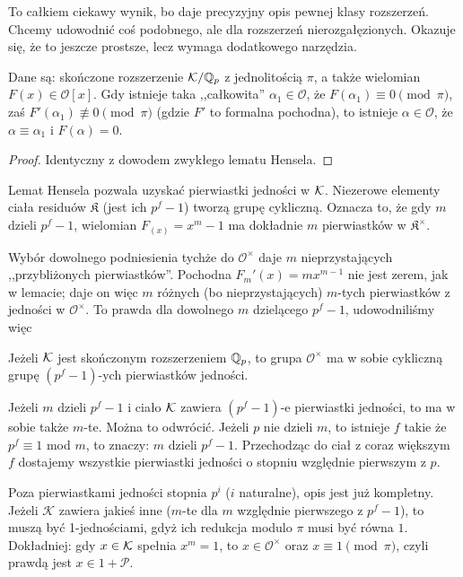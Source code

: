 To całkiem ciekawy wynik, bo daje precyzyjny opis pewnej klasy rozszerzeń.
Chcemy udowodnić coś podobnego, ale dla rozszerzeń nierozgałęzionych.
Okazuje się, że to jeszcze prostsze, lecz wymaga dodatkowego narzędzia.

\begin{twierdzenie}
	Dane są: skończone rozszerzenie $\mathcal K/\mathbb Q_p$ z jednolitością $\pi$, a także wielomian $F(x) \in \mathcal O[x]$.
	Gdy istnieje taka ,,całkowita'' $\alpha_1 \in \mathcal O$, że $F(\alpha_1) \equiv 0 \pmod \pi$, zaś $F'(\alpha_1) \not\equiv 0 \pmod \pi$ (gdzie $F'$ to formalna pochodna), to istnieje $\alpha \in \mathcal O$, że $\alpha \equiv \alpha_1$ i $F(\alpha) = 0$.
\end{twierdzenie}

\begin{proof}
	Identyczny z dowodem zwykłego lematu Hensela.
\end{proof}

Lemat Hensela pozwala uzyskać pierwiastki jedności w $\mathcal K$.
Niezerowe elementy ciała residuów $\mathfrak K$ (jest ich $p^f -1$) tworzą grupę cykliczną.
Oznacza to, że gdy $m$ dzieli $p^f-1$, wielomian $F_(x) = x^m-1$ ma dokładnie $m$ pierwiastków w $\mathfrak K^\times$.

Wybór dowolnego podniesienia tychże do $\mathcal O^\times$ daje $m$ nieprzystających ,,przybliżonych pierwiastków''.
Pochodna $F_m'(x) = mx^{m-1}$ nie jest zerem, jak w lemacie; daje on więc $m$ różnych (bo nieprzystających) $m$-tych pierwiastków z jedności w $\mathcal O^\times$.
To prawda dla dowolnego $m$ dzielącego $p^f-1$, udowodniliśmy więc

\begin{fakt} \label{vergisst}
	Jeżeli $\mathcal K$ jest skończonym rozszerzeniem $\mathbb Q_p$, to grupa $\mathcal O^\times$ ma w sobie cykliczną grupę $(p^f-1)$-ych pierwiastków jedności.
\end{fakt}

Jeżeli $m$ dzieli $p^f-1$ i ciało $\mathcal K$ zawiera $(p^f-1)$-e pierwiastki jedności, to ma w sobie także $m$-te.
Można to odwrócić.
Jeżeli $p$ nie dzieli $m$, to istnieje $f$ takie że $p^f \equiv 1$ mod $m$, to znaczy: $m$ dzieli $p^f-1$.
Przechodząc do ciał z coraz większym $f$ dostajemy wszystkie pierwiastki jedności o stopniu względnie pierwszym z $p$.

Poza pierwiastkami jedności stopnia $p^i$ ($i$ naturalne), opis jest już kompletny.
Jeżeli $\mathcal K$ zawiera jakieś inne ($m$-te dla $m$ względnie pierwszego z $p^f-1$), to muszą być 1-jednościami, gdyż ich redukcja modulo $\pi$ musi być równa $1$.
Dokładniej: gdy $x \in \mathcal K$ spełnia $x^m = 1$, to $x \in \mathcal O^\times$ oraz $x \equiv 1 \pmod \pi$, czyli prawdą jest $x \in 1 + \mathcal P$.


